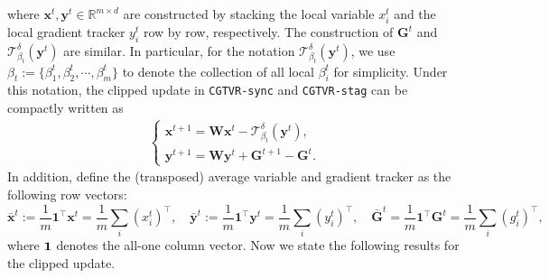 \documentclass{article}
\newcommand{\ctdb}{\mathcal{T}^\delta_{\beta_t}}
\newcommand{\bGt}{\mathbf{G}^t}
\newcommand{\bGte}{\mathbf{G}^{t+1}}
\newcommand{\bxt}{\mathbf{x}^t}
\newcommand{\bxte}{\mathbf{x}^{t+1}}
\newcommand{\byt}{\mathbf{y}^t}
\newcommand{\byte}{\mathbf{y}^{t+1}}
\newcommand{\xit}{x_{i}^{t}}
\newcommand{\yit}{y_{i}^{t}}
\newcommand{\RR}{\mathbb{R}}
\newcommand{\bW}{\mathbf{W}}
\begin{document}
where $\bxt,\byt\in\RR^{m\times d}$ are constructed by stacking the local variable $\xit$ and the local gradient tracker $\yit$ row by row, respectively.   The construction of $\bGt$ and $\ctdb(\byt)$ are similar. In particular, for the notation $\ctdb(\byt)$, we use $\beta_t:=\{\beta_1^t,\beta_2^t,\cdots,\beta_m^t\}$ to denote the collection of all local $\beta_i^t$ for simplicity. Under this notation, the clipped update in \texttt{CGTVR-sync} and \texttt{CGTVR-stag} can be compactly written as 
\begin{eqnarray}
\label{eqn:CGT}
    \begin{cases}
        \bxte = \bW\bxt - \ctdb\left(\byt\right),\\
        \byte = \bW\byt + \bGte- \bGt.
    \end{cases}
\end{eqnarray}
In addition, define the (transposed) average variable and gradient tracker as the following row vectors:
$$\bar{\mathbf{x}}^t:=\frac{1}{m}\mathbf{1}^\top\bxt=\frac{1}{m}\sum_i (\xit)^\top, \quad \bar{\mathbf{y}}^t:=\frac{1}{m}\mathbf{1}^\top\byt=\frac{1}{m}\sum_i (\yit)^\top, \quad \bar{\mathbf{G}}^t = \frac{1}{m}\mathbf{1}^\top \mathbf{G}^t = \frac{1}{m}\sum_i ({g}_i^t)^\top, $$
where ${\bf 1}$ denotes the all-one column vector. Now we state the following results for the clipped update. 
\end{document}
